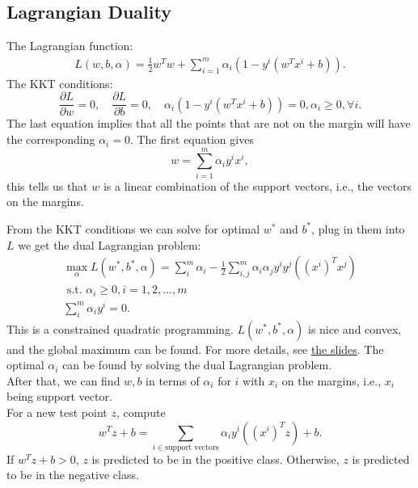 \documentclass[twoside,12pt]{article}
\begin{document}
\subsection{Lagrangian Duality}
The Lagrangian function:
\begin{align}\label{eq3}
L(w,b,\alpha) = \frac 1 2 w^Tw + \sum_{i=1}^m \alpha_i(1-y^i(w^Tx^i + b)).
\end{align}
The KKT conditions:
$$\frac{\partial L}{\partial w} = 0, \quad \frac{\partial L}{\partial b} = 0, \quad \alpha_i(1-y^i(w^Tx^i + b)) = 0, \alpha_i \geq 0,  \forall i.$$
The last equation implies that all the points that are not on the margin will have the corresponding $\alpha_i = 0$. The first equation gives $$w = \sum_{i=1}^m \alpha_i y^i x^i,$$ this tells us that $w$ is a linear combination of the support vectors, i.e., the vectors on the margins. 

From the KKT conditions we can solve for optimal $w^*$ and $b^*$, plug in them into $L$ we get the dual Lagrangian problem:
\begin{align}\label{eq4}
\max_{\alpha} L(w^*, b^*, \alpha) = \sum_{i}^m \alpha_i - \frac 1 2 \sum_{i,j}^m \alpha_i \alpha_j y^i y^j ((x^i)^Tx^j)\\
\text{ s.t. } \alpha_i \geq 0, i = 1, 2, ..., m\\
\sum_i^m \alpha_i y^i = 0. 
\end{align}
This is a constrained quadratic programming. $L(w^*, b^*, \alpha)$ is nice and convex, and the global maximum can be found. For more details, see \href{L(w^*, b^*, \alpha)}{the slides}. The optimal $\alpha_i$ can be found by solving the dual Lagrangian problem. \\

After that, we can find $w, b$ in terms of $\alpha_i$ for $i$ with $x_i$ on the margins, i.e., $x_i$ being support vector. \\

For a new test point $z$, compute $$w^Tz + b = \sum_{i \in \text{support vectors}} \alpha_i y^i((x^i)^Tz) + b.$$
If $w^Tz + b > 0$, $z$ is predicted to be in the positive class. Otherwise, $z$ is predicted to be in the negative class.
\end{document}
